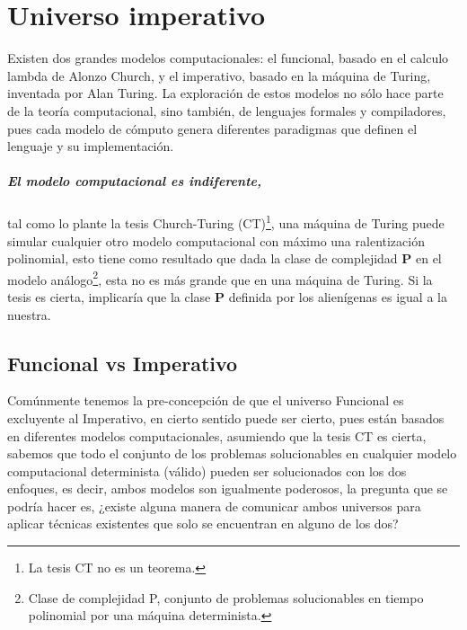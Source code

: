 
\chapter{Universo imperativo}

Existen dos grandes modelos computacionales: el funcional, basado en el calculo lambda de Alonzo Church, y el imperativo, basado en la máquina de Turing, inventada por Alan Turing. La exploración de estos modelos no sólo hace parte de la teoría computacional, sino también, de lenguajes formales y compiladores, pues cada modelo de cómputo genera diferentes paradigmas que definen el lenguaje y su implementación.

\paragraph{El modelo computacional es indiferente,} tal como lo plante la tesis Church-Turing (CT)\footnote{La tesis CT no es un teorema.}, una máquina de Turing puede simular cualquier otro modelo computacional con máximo una ralentización polinomial, esto tiene como resultado que dada la clase de complejidad \textbf{P}  en el modelo análogo\footnote{Clase de complejidad P, conjunto de problemas solucionables en tiempo polinomial por una máquina determinista.}, esta no es más grande que en una máquina de Turing. Si la tesis es cierta, implicaría que la clase \textbf{P} definida por los alienígenas es igual a la nuestra. \cite{Arora2009}




\section{Funcional vs Imperativo}

Comúnmente tenemos la pre-concepción de que el universo Funcional es excluyente al Imperativo, en cierto sentido puede ser cierto, pues están basados en diferentes modelos computacionales, asumiendo que la tesis CT es cierta, sabemos que todo el conjunto de los problemas solucionables en cualquier modelo computacional determinista (válido) pueden ser solucionados con los dos enfoques, es decir, ambos modelos son igualmente poderosos, la pregunta que se podría hacer es, ¿existe alguna manera de comunicar ambos universos para aplicar técnicas existentes que solo se encuentran en alguno de los dos?


